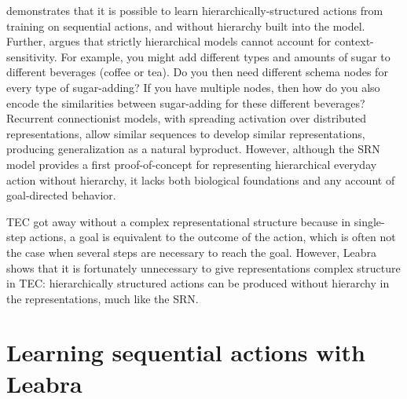 \documentclass[10pt,letterpaper]{article}
\numberwithin{equation}{section}
\begin{document}

 demonstrates that it is possible to learn hierarchically-structured actions from training on sequential actions, and without hierarchy built into the model. Further,  argues that strictly hierarchical models cannot account for context-sensitivity. For example, you might add different types and amounts of sugar to different beverages (coffee or tea). Do you then need different schema nodes for every type of sugar-adding? If you have multiple nodes, then how do you also encode the similarities between sugar-adding for these different beverages? Recurrent connectionist models, with spreading activation over distributed representations, allow similar sequences to develop similar representations, producing generalization as a natural byproduct. However, although the SRN model provides a first proof-of-concept for representing hierarchical everyday action without hierarchy, it lacks both biological foundations and any account of goal-directed behavior. 

TEC got away without a complex representational structure because in single-step actions, a goal is equivalent to the outcome of the action, which is often not the case when several steps are necessary to reach the goal. However, Leabra shows that it is fortunately unnecessary to give representations complex structure in TEC: hierarchically structured actions can be produced without hierarchy in the representations, much like the SRN. %


\section*{Learning sequential actions with Leabra}
\end{document}

